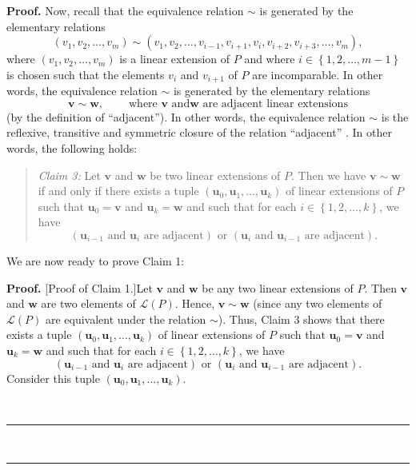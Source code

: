 \documentclass[numbers=enddot,12pt,final,onecolumn,notitlepage]{scrartcl}%
\theoremstyle{definition}
\newenvironment{verlong}{}{}
\newenvironment{statement}{\begin{quote}}{\end{quote}}
\newenvironment{proof}[1][Proof]{\noindent\textbf{#1.} }{\ \rule{0.5em}{0.5em}}
\begin{document}
\begin{verlong}
\begin{proof}
Now, recall that the equivalence relation $\sim$ is generated by the
elementary relations
\[
\left(  v_{1},v_{2},\ldots,v_{m}\right)  \sim\left(  v_{1},v_{2}%
,\ldots,v_{i-1},v_{i+1},v_{i},v_{i+2},v_{i+3},\ldots,v_{m}\right)  ,
\]
where $\left(  v_{1},v_{2},\ldots,v_{m}\right)  $ is a linear extension of $P$
and where $i\in\left\{  1,2,\ldots,m-1\right\}  $ is chosen such that the
elements $v_{i}$ and $v_{i+1}$ of $P$ are incomparable. In other words, the
equivalence relation $\sim$ is generated by the elementary relations%
\[
\mathbf{v}\sim\mathbf{w},\ \ \ \ \ \ \ \ \ \ \text{where }\mathbf{v}\text{ and
}\mathbf{w}\text{ are adjacent linear extensions}%
\]
(by the definition of \textquotedblleft adjacent\textquotedblright). In other
words, the equivalence relation $\sim$ is the reflexive, transitive and
symmetric closure of the relation \textquotedblleft adjacent\textquotedblright%
. In other words, the following holds:

\begin{statement}
\textit{Claim 3:} Let $\mathbf{v}$ and $\mathbf{w}$ be two linear extensions
of $P$. Then we have $\mathbf{v}\sim\mathbf{w}$ if and only if there exists a
tuple $\left(  \mathbf{u}_{0},\mathbf{u}_{1},\ldots,\mathbf{u}_{k}\right)  $
of linear extensions of $P$ such that $\mathbf{u}_{0}=\mathbf{v}$ and
$\mathbf{u}_{k}=\mathbf{w}$ and such that for each $i\in\left\{
1,2,\ldots,k\right\}  $, we have%
\[
\left(  \mathbf{u}_{i-1}\text{ and }\mathbf{u}_{i}\text{ are adjacent}\right)
\text{ or }\left(  \mathbf{u}_{i}\text{ and }\mathbf{u}_{i-1}\text{ are
adjacent}\right)  .
\]

\end{statement}

We are now ready to prove Claim 1:

\begin{proof}
[Proof of Claim 1.]Let $\mathbf{v}$ and $\mathbf{w}$ be any two linear
extensions of $P$. Then $\mathbf{v}$ and $\mathbf{w}$ are two elements of
$\mathcal{L}\left(  P\right)  $. Hence, $\mathbf{v}\sim\mathbf{w}$ (since any
two elements of $\mathcal{L}\left(  P\right)  $ are equivalent under the
relation $\sim$). Thus, Claim 3 shows that there exists a tuple $\left(
\mathbf{u}_{0},\mathbf{u}_{1},\ldots,\mathbf{u}_{k}\right)  $ of linear
extensions of $P$ such that $\mathbf{u}_{0}=\mathbf{v}$ and $\mathbf{u}%
_{k}=\mathbf{w}$ and such that for each $i\in\left\{  1,2,\ldots,k\right\}  $,
we have%
\begin{equation}
\left(  \mathbf{u}_{i-1}\text{ and }\mathbf{u}_{i}\text{ are adjacent}\right)
\text{ or }\left(  \mathbf{u}_{i}\text{ and }\mathbf{u}_{i-1}\text{ are
adjacent}\right)  . \label{pf.cor.R.welldef.c1.pf.1}%
\end{equation}
Consider this tuple $\left(  \mathbf{u}_{0},\mathbf{u}_{1},\ldots
,\mathbf{u}_{k}\right)  $.


\end{proof}
\end{proof}
\end{verlong}
\end{document}
